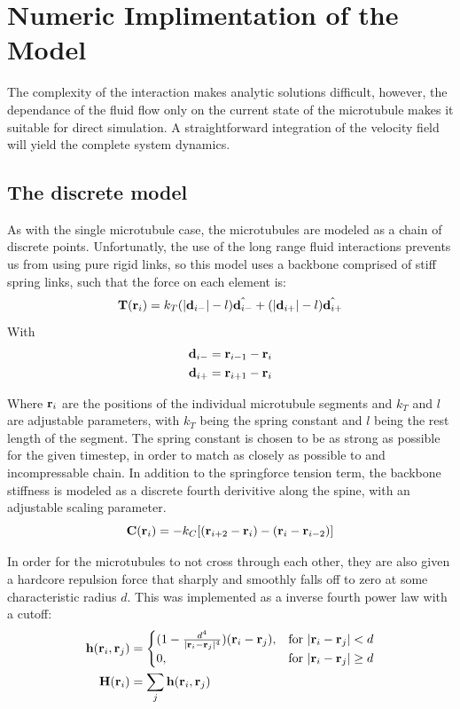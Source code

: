 \documentclass[11pt]{ucthesis}
\def\br{{\bf r}}
\begin{document}
\section{Numeric Implimentation of the Model}
The complexity of the interaction makes analytic solutions difficult, however, the dependance of the fluid flow only on the current state of the microtubule makes it suitable for direct simulation. A straightforward integration of the velocity field will yield the complete system dynamics.
\subsection{The discrete model}
As with the single microtubule case, the microtubules are modeled as a chain of discrete points. Unfortunatly, the use of the long range fluid interactions prevents us from using pure rigid links, so this model uses a backbone comprised of stiff spring links, such that the force on each element is:
\begin{equation}
\label{eq:discretespring}
\mathbf{T}(\br_i) = k_T ( |\mathbf{d}_{i-}| - l )\hat{\mathbf{d}_{i-}} + ( |\mathbf{d}_{i+}| - l )\hat{\mathbf{d}_{i+}}
\end{equation}
With 
\begin{eqnarray*}
\mathbf{d}_{i-} &= \br_{i-1} - \br_i \\
\mathbf{d}_{i+} &= \br_{i+1} - \br_i
\end{eqnarray*}

Where $\br_i$ are the positions of the individual microtubule segments and $k_T$ and $l$  are adjustable parameters, with $k_T$ being the spring constant and $l$ being the rest length of the segment.  The spring constant is chosen to be as strong as possible for the given timestep, in order to match as closely as possible to and incompressable chain.
In addition to the springforce tension term, the backbone stiffness is modeled as a discrete fourth derivitive along the spine, with an adjustable scaling parameter.
\begin{equation}
\label{eq:discretestiff}
\mathbf{C}(\br_i) =  - k_C[ (\br_{i+2} - \br_i) - (\br_i - \br_{i-2})]
\end{equation}

In order for the microtubules to not cross through each other, they are also given a hardcore repulsion force that sharply and smoothly falls off to zero at some characteristic radius $d$.
This was implemented as a inverse fourth power law with a cutoff:
\begin{align}
\label{eq:discretehardcore}
\mathbf{h}(\br_i,\br_j) &= \begin{cases}(1 - \frac{d^4}{|\br_i - \br_j|^4})(\br_i - \br_j),&  \text{for } |\br_i - \br_j| < d \\
0,& \text{for } |\br_i - \br_j| \ge d \end{cases}\\
\mathbf{H}(\br_i) &= \sum_j \mathbf{h}(\br_i,\br_j)
\end{align}
\end{document}
